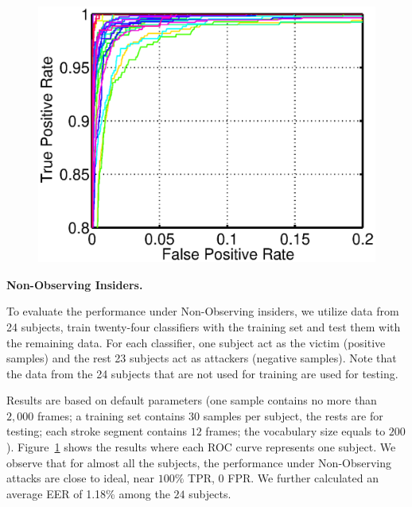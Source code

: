 \begin{figure}[!b]
\centering
\vspace{-6mm}
{\includegraphics[width=.8\columnwidth]{./Graphic/roc/fig_11_24random.eps}}
\vspace{-3mm}
\caption{\vspace{-1mm}}\label{fig:random}
\vspace{-1mm}
\end{figure}

 


\textbf{Non-Observing Insiders.} 

To evaluate the performance under Non-Observing insiders, 
we utilize data from 24 subjects, train twenty-four classifiers with the training set and test them with the remaining data. For each classifier, one subject act as the victim (positive samples) and the rest 23 subjects act as attackers (negative  samples). Note that the data from the 24 subjects that are not used for training are used for testing.


 Results are based on default parameters (one sample contains no more than $2,000$ frames; a training set contains $30$ samples per subject, the rests are for testing; each stroke segment contains $12$ frames; the vocabulary size equals to $200$). Figure~\ref{fig:random} shows the results where each ROC curve represents one subject. We observe that for almost all the subjects, the performance under Non-Observing attacks are close to ideal, near $100\%$ TPR, 0 FPR.   We further calculated an average EER of 1.18\% among the $24$ subjects.

